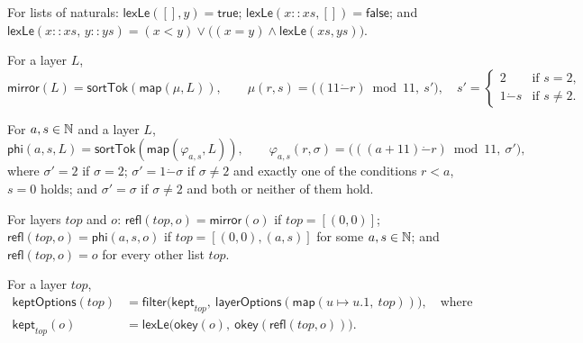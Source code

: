 \begin{definition}\label{cb:def:lexle}
For lists of naturals: $\mathsf{lexLe}([],y)=\mathsf{true}$; $\mathsf{lexLe}(x\mathbin{::}xs,[])=\mathsf{false}$; and
$\mathsf{lexLe}(x\mathbin{::}xs,\,y\mathbin{::}ys)=(x<y)\vee\big((x=y)\wedge\mathsf{lexLe}(xs,ys)\big)$.
\end{definition}

\begin{definition}\label{cb:def:mirror}
For a layer $L$,
\[
\mathsf{mirror}(L)=\mathsf{sortTok}(\mathsf{map}(\mu,L)),\qquad
\mu(r,s)=\big((11\mathbin{\dot-}r)\bmod11,\ s'\big),\quad s'=\begin{cases}2&\text{if }s=2,\\
1\mathbin{\dot-}s&\text{if }s\ne2.\end{cases}
\]
\end{definition}

\begin{definition}\label{cb:def:phi}
For $a,s\in\mathbb N$ and a layer $L$,
\[
\mathsf{phi}(a,s,L)=\mathsf{sortTok}(\mathsf{map}(\varphi_{a,s},L)),\qquad
\varphi_{a,s}(r,\sigma)=\big(((a+11)\mathbin{\dot-}r)\bmod11,\ \sigma'\big),
\]
where $\sigma'=2$ if $\sigma=2$; $\sigma'=1\mathbin{\dot-}\sigma$ if $\sigma\ne2$ and exactly one of the conditions
$r<a$, $s=0$ holds; and $\sigma'=\sigma$ if $\sigma\neq2$ and both or neither of them hold.
\end{definition}

\begin{definition}\label{cb:def:refl}
For layers $top$ and $o$: $\mathsf{refl}(top,o)=\mathsf{mirror}(o)$ if $top=[(0,0)]$;
$\mathsf{refl}(top,o)=\mathsf{phi}(a,s,o)$ if $top=[(0,0),(a,s)]$ for some $a,s\in\mathbb N$; and
$\mathsf{refl}(top,o)=o$ for every other list $top$.
\end{definition}

\begin{definition}\label{cb:def:kept}
For a layer $top$,
\begin{align*}
\mathsf{keptOptions}(top)&=\mathsf{filter}\big(\mathsf{kept}_{top},\ \mathsf{layerOptions}(\mathsf{map}(u\mapsto
u.1,\ top))\big),\quad\text{where}\\
\mathsf{kept}_{top}(o)&=\mathsf{lexLe}\big(\mathsf{okey}(o),\ \mathsf{okey}(\mathsf{refl}(top,o))\big).
\end{align*}
\end{definition}

